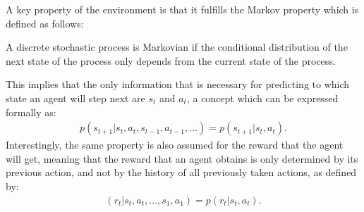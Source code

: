 A key property of the environment is that it fulfills the Markov property which is defined as follows:
\begin{definition}
	A discrete stochastic process is Markovian if the conditional distribution of the next state of the process only depends from the current state of the process.
\end{definition}
This implies that the only information that is necessary for predicting to which state an agent will step next are $s_t$ and $a_t$, a concept which can be expressed formally as:
\begin{align}
	p(s_{t+1}|s_t, a_t, s_{t-1}, a_{t-1}, \ldots) = p(s_{t+1} | s_t, a_t).
\end{align}
Interestingly, the same property is also assumed for the reward that the agent will get, meaning that the reward that an agent obtains is only determined by its previous action, and not by the history of all previously taken actions, as defined by:
\begin{align}
	(r_t| s_t, a_t, \ldots, s_1, a_1) = p(r_t|s_t,a_t).
\end{align}


